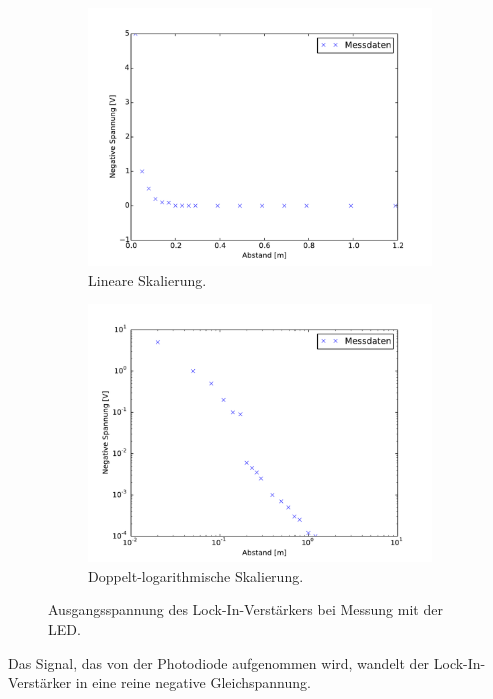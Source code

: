\begin{figure}[hbp]
	\centering
	\begin{subfigure}{0.8\textwidth}
		\includegraphics[width=\textwidth]{Bilder/LED.pdf}
		\caption{Lineare Skalierung.}
	\end{subfigure}
	\begin{subfigure}{0.8\textwidth}
		\includegraphics[width=\textwidth]{Bilder/LED_log.pdf}
		\caption{Doppelt-logarithmische Skalierung.}
		\label{diag:LED_log}
	\end{subfigure}
	\caption{Ausgangsspannung des Lock-In-Verstärkers bei Messung mit der LED.}
	\label{diag:LED}
\end{figure}
Das Signal, das von der Photodiode aufgenommen wird, wandelt der Lock-In-Verstärker in eine reine negative Gleichspannung.
